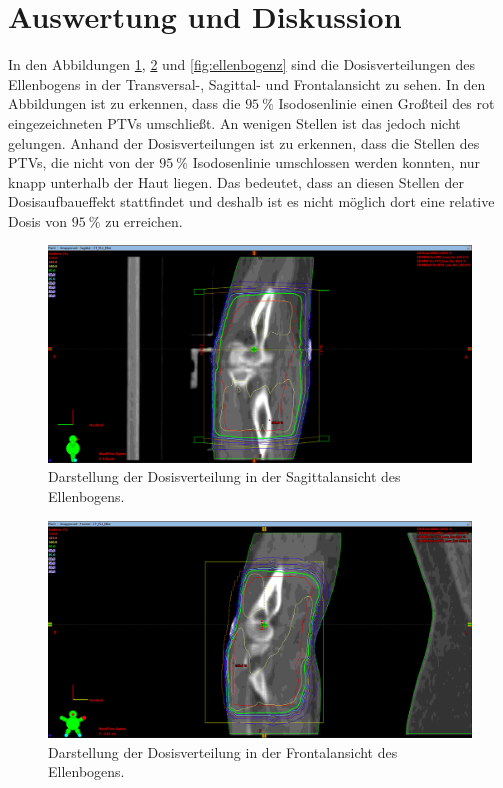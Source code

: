 \section{Auswertung und Diskussion}
\label{sec:AuswertundDiskussion}
In den Abbildungen \ref{fig:ellenbogenx}, \ref{fig:ellenbogeny} und \ref{fig:ellenbogenz} sind die Dosisverteilungen des
Ellenbogens in der Transversal-, Sagittal- und Frontalansicht zu sehen. In den Abbildungen ist zu erkennen, dass die $\SI{95}{\percent}$ Isodosenlinie
einen Großteil des rot eingezeichneten PTVs umschließt. An wenigen Stellen ist das jedoch nicht gelungen. Anhand der Dosisverteilungen ist zu
erkennen, dass die Stellen des PTVs, die nicht von der $\SI{95}{\percent}$ Isodosenlinie umschlossen werden konnten, nur knapp unterhalb der Haut liegen.
Das bedeutet, dass an diesen Stellen der Dosisaufbaueffekt stattfindet und deshalb ist es nicht möglich dort eine relative Dosis von $\SI{95}{\percent}$
zu erreichen.

\begin{figure}[H]
	\centering
	\includegraphics[width=\textwidth]{../Bilder/EllenbogenX.png}
	\caption{Darstellung der Dosisverteilung in der Sagittalansicht des Ellenbogens.}
	\label{fig:ellenbogenx}
\end{figure}

\begin{figure}[H]
	\centering
	\includegraphics[width=\textwidth]{../Bilder/EllenbogenY.png}
	\caption{Darstellung der Dosisverteilung in der Frontalansicht des Ellenbogens.}
	\label{fig:ellenbogeny}
\end{figure}

